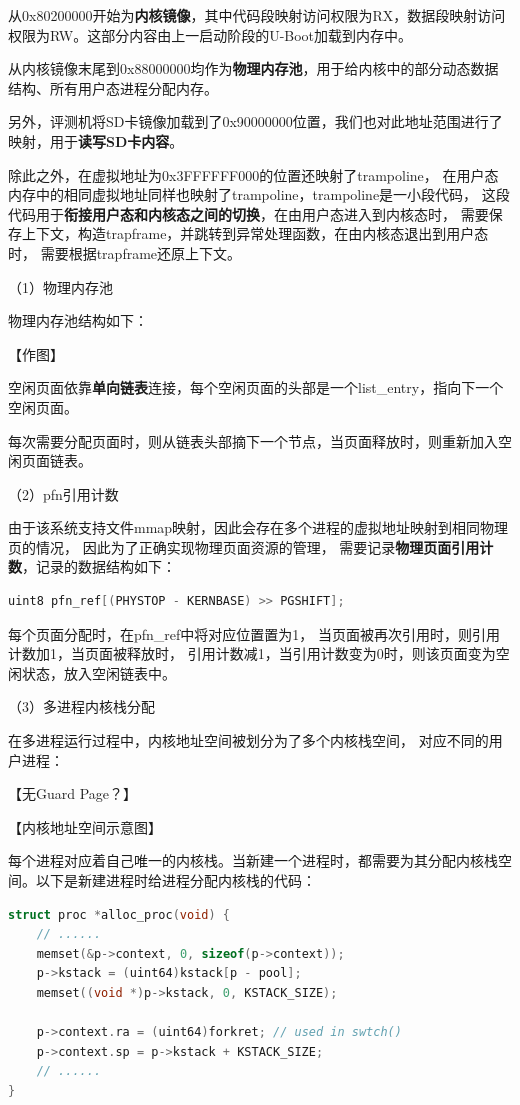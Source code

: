 \documentclass[UTF8,a4paper,10pt]{ctexart}
\begin{document}
从0x80200000开始为\textbf{内核镜像}，其中代码段映射访问权限为RX，数据段映射访问权限为RW。这部分内容由上一启动阶段的U-Boot加载到内存中。

从内核镜像末尾到0x88000000均作为\textbf{物理内存池}，用于给内核中的部分动态数据结构、所有用户态进程分配内存。

另外，评测机将SD卡镜像加载到了0x90000000位置，我们也对此地址范围进行了映射，用于\textbf{读写SD卡内容}。

除此之外，在虚拟地址为0x3FFFFFF000的位置还映射了trampoline，
在用户态内存中的相同虚拟地址同样也映射了trampoline，trampoline是一小段代码，
这段代码用于\textbf{衔接用户态和内核态之间的切换}，在由用户态进入到内核态时，
需要保存上下文，构造trapframe，并跳转到异常处理函数，在由内核态退出到用户态时，
需要根据trapframe还原上下文。

（1）物理内存池

物理内存池结构如下：

【作图】

空闲页面依靠\textbf{单向链表}连接，每个空闲页面的头部是一个list\_entry，指向下一个空闲页面。

每次需要分配页面时，则从链表头部摘下一个节点，当页面释放时，则重新加入空闲页面链表。

（2）pfn引用计数

由于该系统支持文件mmap映射，因此会存在多个进程的虚拟地址映射到相同物理页的情况，
因此为了正确实现物理页面资源的管理，
需要记录\textbf{物理页面引用计数}，记录的数据结构如下：

\begin{lstlisting}[title=页面引用计数,frame=trbl,language={C}]
  uint8 pfn_ref[(PHYSTOP - KERNBASE) >> PGSHIFT];
\end{lstlisting}

每个页面分配时，在pfn\_ref中将对应位置置为1，
当页面被再次引用时，则引用计数加1，当页面被释放时，
引用计数减1，当引用计数变为0时，则该页面变为空闲状态，放入空闲链表中。

（3）多进程内核栈分配

在多进程运行过程中，内核地址空间被划分为了多个内核栈空间，
对应不同的用户进程：

【无Guard Page？】

【内核地址空间示意图】

每个进程对应着自己唯一的内核栈。当新建一个进程时，都需要为其分配内核栈空间。以下是新建进程时给进程分配内核栈的代码：

\begin{lstlisting}[title=分配内核栈空间,frame=trbl,language={C}]
struct proc *alloc_proc(void) {
    // ......
    memset(&p->context, 0, sizeof(p->context));
    p->kstack = (uint64)kstack[p - pool];
    memset((void *)p->kstack, 0, KSTACK_SIZE);

    p->context.ra = (uint64)forkret; // used in swtch()
    p->context.sp = p->kstack + KSTACK_SIZE;
    // ......
}
\end{lstlisting}
\end{document}

